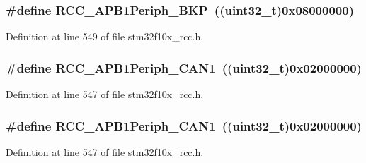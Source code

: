 \subsubsection[{\texorpdfstring{R\+C\+C\+\_\+\+A\+P\+B1\+Periph\+\_\+\+B\+KP}{RCC_APB1Periph_BKP}}]{\setlength{\rightskip}{0pt plus 5cm}\#define R\+C\+C\+\_\+\+A\+P\+B1\+Periph\+\_\+\+B\+KP~(({\bf uint32\+\_\+t})0x08000000)}\hypertarget{group___a_p_b1__peripheral_ga2a26b65d0e38030e414a9d39276645b1}{}\label{group___a_p_b1__peripheral_ga2a26b65d0e38030e414a9d39276645b1}


Definition at line 549 of file stm32f10x\+\_\+rcc.\+h.

\subsubsection[{\texorpdfstring{R\+C\+C\+\_\+\+A\+P\+B1\+Periph\+\_\+\+C\+A\+N1}{RCC_APB1Periph_CAN1}}]{\setlength{\rightskip}{0pt plus 5cm}\#define R\+C\+C\+\_\+\+A\+P\+B1\+Periph\+\_\+\+C\+A\+N1~(({\bf uint32\+\_\+t})0x02000000)}\hypertarget{group___a_p_b1__peripheral_ga7f1d940739de0134ae89e9e04214989d}{}\label{group___a_p_b1__peripheral_ga7f1d940739de0134ae89e9e04214989d}


Definition at line 547 of file stm32f10x\+\_\+rcc.\+h.

\subsubsection[{\texorpdfstring{R\+C\+C\+\_\+\+A\+P\+B1\+Periph\+\_\+\+C\+A\+N1}{RCC_APB1Periph_CAN1}}]{\setlength{\rightskip}{0pt plus 5cm}\#define R\+C\+C\+\_\+\+A\+P\+B1\+Periph\+\_\+\+C\+A\+N1~(({\bf uint32\+\_\+t})0x02000000)}\hypertarget{group___a_p_b1__peripheral_ga7f1d940739de0134ae89e9e04214989d}{}\label{group___a_p_b1__peripheral_ga7f1d940739de0134ae89e9e04214989d}


Definition at line 547 of file stm32f10x\+\_\+rcc.\+h.

